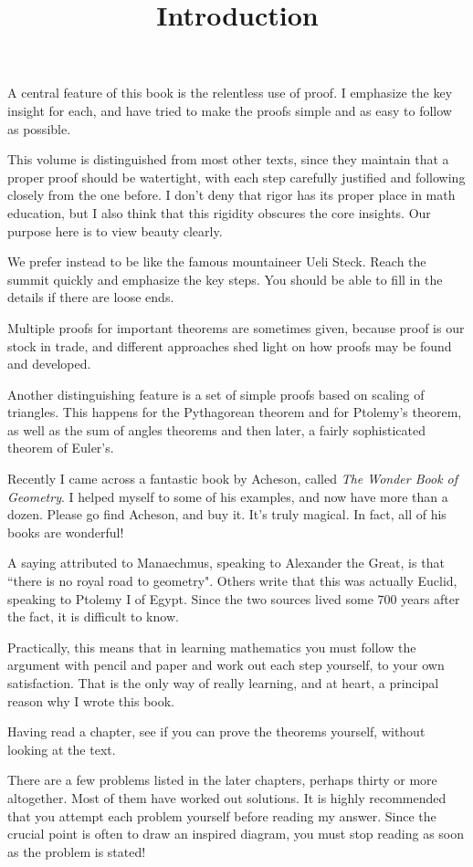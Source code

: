 \documentclass[11pt, oneside]{article}
\title{Introduction}
\date{}
\begin{document}
\maketitle
\Large


\label{sec:additional_notes}

A central feature of this book is the relentless use of proof.  I emphasize the key insight for each, and have tried to make the proofs simple and as easy to follow as possible.

This volume is distinguished from most other texts, since they maintain that a proper proof should be watertight, with each step carefully justified and following closely from the one before.  I don't deny that rigor has its proper place in math education, but I also think that this rigidity obscures the core insights.  Our purpose here is to view beauty clearly.

We prefer instead to be like the famous mountaineer Ueli Steck.  Reach the summit quickly and emphasize the key steps.  You should be able to fill in the details if there are loose ends.

Multiple proofs for important theorems are sometimes given, because proof is our stock in trade, and different approaches shed light on how proofs may be found and developed.

Another distinguishing feature is a set of simple proofs based on scaling of triangles.  This happens for the Pythagorean theorem and for Ptolemy's theorem, as well as the sum of angles theorems and then later, a fairly sophisticated theorem of Euler's.

Recently I came across a fantastic book by Acheson, called \emph{The Wonder Book of Geometry}.  I helped myself to some of his examples, and now have more than a dozen.  Please go find Acheson, and buy it.  It's truly magical.  In fact, all of his books are wonderful!

A saying attributed to Manaechmus, speaking to Alexander the Great, is that ``there is no royal road to geometry".  Others write that this was actually Euclid, speaking to Ptolemy I of Egypt.  Since the two sources lived some 700 years after the fact, it is difficult to know.

Practically, this means that in learning mathematics you must follow the argument with pencil and paper and work out each step yourself, to your own satisfaction.  That is the only way of really learning, and at heart, a principal reason why I wrote this book.  

Having read a chapter, see if you can prove the theorems yourself, without looking at the text.

There are a few problems listed in the later chapters, perhaps thirty or more altogether.  Most of them have worked out solutions.  It is highly recommended that you attempt each problem yourself before reading my answer.  Since the crucial point is often to draw an inspired diagram, you must stop reading as soon as the problem is stated!
\end{document}
